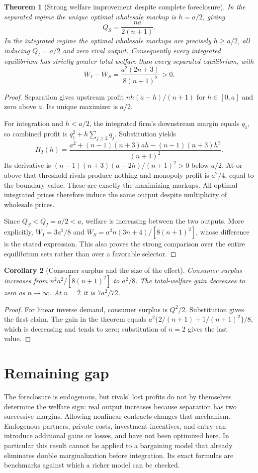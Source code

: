 \documentclass[11pt]{article}
\newtheorem{theorem}{Theorem}
\newtheorem{corollary}[theorem]{Corollary}
\theoremstyle{definition}
\theoremstyle{remark}
\begin{document}
\begin{theorem}[Strong welfare improvement despite complete foreclosure]
In the separated regime the unique optimal wholesale markup is $h=a/2$, giving
\[
 Q_S=\frac{na}{2(n+1)}.
\]
In the integrated regime the optimal wholesale markups are precisely $h\ge a/2$, all inducing $Q_I=a/2$ and zero rival output. Consequently every integrated equilibrium has strictly greater total welfare than every separated equilibrium, with
\[
 W_I-W_S=\frac{a^2(2n+3)}{8(n+1)^2}>0.
\]
\end{theorem}
\begin{proof}
Separation gives upstream profit $nh(a-h)/(n+1)$ for $h\in[0,a]$ and zero above $a$. Its unique maximizer is $a/2$.

For integration and $h<a/2$, the integrated firm's downstream margin equals $q_1$, so combined profit is $q_1^2+h\sum_{j\ge2}q_j$. Substitution yields
\[
 \Pi_I(h)=\frac{a^2+(n-1)(n+3)ah-(n-1)(n+3)h^2}{(n+1)^2}.
\]
Its derivative is $(n-1)(n+3)(a-2h)/(n+1)^2>0$ below $a/2$. At or above that threshold rivals produce nothing and monopoly profit is $a^2/4$, equal to the boundary value. These are exactly the maximizing markups. All optimal integrated prices therefore induce the same output despite multiplicity of wholesale prices.

Since $Q_S<Q_I=a/2<a$, welfare is increasing between the two outputs. More explicitly, $W_I=3a^2/8$ and $W_S=a^2 n(3n+4)/[8(n+1)^2]$, whose difference is the stated expression. This also proves the strong comparison over the entire equilibrium sets rather than over a favorable selector.
\end{proof}

\begin{corollary}[Consumer surplus and the size of the effect]
Consumer surplus increases from $n^2a^2/[8(n+1)^2]$ to $a^2/8$. The total-welfare gain decreases to zero as $n\to\infty$. At $n=2$ it is $7a^2/72$.
\end{corollary}
\begin{proof}
For linear inverse demand, consumer surplus is $Q^2/2$. Substitution gives the first claim. The gain in the theorem equals $a^2\{2/(n+1)+1/(n+1)^2\}/8$, which is decreasing and tends to zero; substitution of $n=2$ gives the last value.
\end{proof}

\section{Remaining gap}
The foreclosure is endogenous, but rivals' lost profits do not by themselves determine the welfare sign: real output increases because separation has two successive margins. Allowing nonlinear contracts changes that mechanism. Endogenous partners, private costs, investment incentives, and entry can introduce additional gains or losses, and have not been optimized here. In particular this result cannot be applied to a bargaining model that already eliminates double marginalization before integration. Its exact formulas are benchmarks against which a richer model can be checked.
\end{document}
